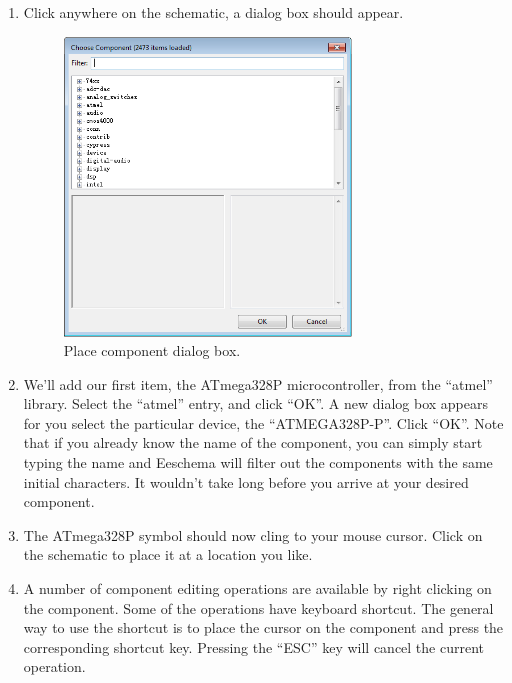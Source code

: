 \documentclass[12pt,letterpaper]{scrartcl}
\begin{document}
\begin{enumerate}
\begin{enumerate}
			\item Click anywhere on the schematic, a dialog box should appear. 
				\begin{figure}[h]
					\centering
					\includegraphics[width=3in]{place-component.png}
					\caption{Place component dialog box.}
					\label{fig:place-component}
				\end{figure}

			\item We'll add our first item, the ATmega328P microcontroller, from the ``atmel'' library. Select the ``atmel'' entry, and click ``OK''. A new dialog box appears for you select the particular device, the “ATMEGA328P-P”. Click ``OK''. Note that if you already know the name of the component, you can simply start typing the name and Eeschema will filter out the components with the same initial characters. It wouldn't take long before you arrive at your desired component.
			
			\item The ATmega328P symbol should now cling to your mouse cursor. Click on the schematic to place it at a location you like. 
			\item A number of component editing operations are available by right clicking on the component. Some of the operations have keyboard shortcut. The general way to use the shortcut is to place the cursor on the component and press the corresponding shortcut key. Pressing the ``ESC'' key will cancel the current operation. 
			

\end{enumerate}
\end{enumerate}
\end{document}
